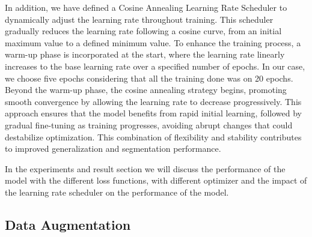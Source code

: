\documentclass[10pt,twocolumn,letterpaper]{article}
\begin{document}
In addition, we have defined a Cosine Annealing Learning Rate Scheduler to dynamically adjust the learning rate throughout training. This scheduler gradually reduces the learning rate following a cosine curve, from an initial maximum value to a defined minimum value. To enhance the training process, a warm-up phase is incorporated at the start, where the learning rate linearly increases to the base learning rate over a specified number of epochs. In our case, we choose five epochs considering that all the training done was on 20 epochs. Beyond the warm-up phase, the cosine annealing strategy begins, promoting smooth convergence by allowing the learning rate to decrease progressively. This approach ensures that the model benefits from rapid initial learning, followed by gradual fine-tuning as training progresses, avoiding abrupt changes that could destabilize optimization. This combination of flexibility and stability contributes to improved generalization and segmentation performance.

In the experiments and result section we will discuss the performance of the model with the different loss functions, with different optimizer and the impact of the learning rate scheduler on the performance of the model. 

\subsection{Data Augmentation}
\end{document}
